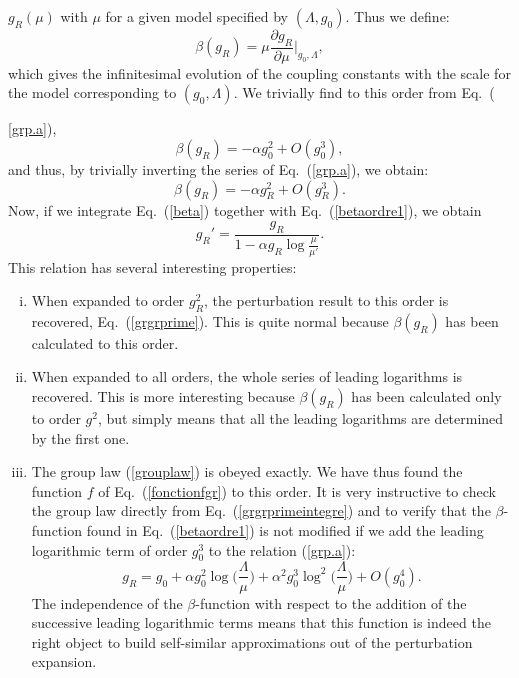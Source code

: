 \documentclass[floatfix,twocolumn,preprintnumbers,amsmath,amssymb,prb]{revtex4}
\begin{document}
$g_R(\mu)$ with $\mu$ for a given model specified by
$(\Lambda,g_0)$. Thus we define:
\begin{equation} 
\beta(g_R)=\mu\frac{\partial
g_R}{\partial\mu}\bigg|_{g_0,\Lambda},
\label{beta}
\end{equation}
which gives the infinitesimal evolution of the coupling constants
with the scale for the model corresponding to 
$(g_0,\Lambda)$. We trivially find to this order from
Eq.~({\ref{grp.a}),
\begin{equation}
\beta(g_R) =-\alpha g_0^2 +O(g_0^3),
\label{betag0}
\end{equation}
and thus, by trivially inverting the series of Eq.~(\ref{grp.a}), we
obtain:
\begin{equation}
\beta(g_R) =-\alpha g_R^2 +O(g_R^3).
\label{betaordre1}
\end{equation}
Now, if we integrate Eq.~(\ref{beta}) together with
Eq.~(\ref{betaordre1}), we obtain
\begin{equation}
g_R'=\frac{g_R}{1-\alpha g_R \log\frac{\mu}{\mu'}}.
\label{grgrprimeintegre}
\end{equation}
This relation has several interesting properties:

\begin{enumerate}[(i)]

\item When expanded to order $g_R^2$, the perturbation result
to this order is recovered, Eq.~(\ref{grgrprime}). This is quite
normal because $\beta(g_R)$ has been calculated to this order.

\item When expanded to all orders, the whole series of leading
logarithms is recovered. This is more interesting because
$\beta(g_R)$ has been calculated only to order $g^2$, but 
simply means that all the leading logarithms are
determined by the first one.

\item The group law (\ref{grouplaw}) is obeyed exactly. We
have thus found the function $f$ of Eq.~(\ref{fonctionfgr}) to
this order. It is very instructive to check the group law directly
from Eq.~(\ref{grgrprimeintegre}) and to verify that the
$\beta$-function found in Eq.~(\ref{betaordre1}) is not
modified if we add the leading logarithmic term of order $g_0^3$
to the relation (\ref{grp.a}): 
\begin{equation}
g_R=g_0 +\alpha g_0^2 \log\big(\frac{\Lambda}{\mu}\big)+\alpha^2
g_0^3 \log^2\big(\frac{\Lambda}{\mu}\big) + O(g_0^4).
\label{relationordre3grg0}
\end{equation}
The independence of the $\beta$-function with respect to the addition of
the successive leading logarithmic terms means that this function is indeed
the right object to build self-similar approximations out of the
perturbation expansion. 


\end{enumerate}}
\end{document}
